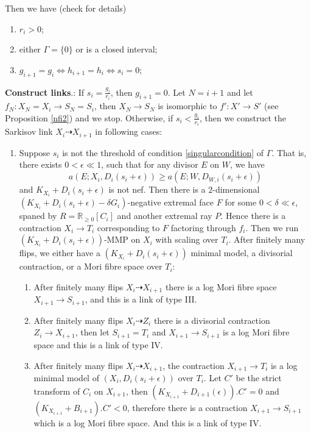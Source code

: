 \documentclass{article}
\begin{document}
Then we have (check \cite[Lemma 4.4]{liuSarkisovProgramGeneralized2021} for details)
\begin{enumerate}
    \item $r_{i}>0$;
    \item either $\Gamma=\{0\} $ or is a closed interval;
    \item $g_{i+1}=g_{i} \Leftrightarrow h_{i+1}=h_{i} \Leftrightarrow s_{i}=0$;
\end{enumerate}
\textbf{Construct links}\label{Construction}.: If $s_{i}=\frac{g_{i}}{r_{i}}$, then $g_{i+1}=0$. Let $N=i+1$  and let $f_{N}:X_{N}=X_{i} \to S_{N}=S_{i}$, then $X_{N}\to S_{N}$ is isomorphic to $f':X'\to S'$ (see Proposition \ref{nfi2}) and  we stop. Otherwise, if  $s_{i}<\frac{g_{i}}{r_{i}}$, then we construct the Sarkisov link $X_{i}\dashrightarrow X_{i+1}$ in following cases:
\begin{enumerate}
  \item\label{2a} Suppose $s_{i}$ is not the threshold of  condition \ref{singularcondition} of $\Gamma$. That is, there exists $0<\epsilon\ll 1$, such that for any divisor $E$ on $W$, we have
    \[
      a(E;X_{i},D_{i}(s_{i}+\epsilon))\geqslant a(E;W,D_{W,i}(s_{i}+\epsilon))
    \]
    and $K_{X_{i}}+D_{i}(s_{i}+\epsilon)$ is not nef. Then there is a $2$-dimensional $(K_{X_{i}}+D_{i}(s_{i}+\epsilon)-\delta G_{i})$-negative extremal face $F$ for some $0< \delta \ll \epsilon $, spaned by $R=\mathbb{R}_{\geqslant 0}[C_{i}]$ and another extremal ray $P$. Hence there is a contraction $X_{i}\to T_{i}$ corresponding to $F$ factoring through $f_{i}$. Then we run $(K_{X_{i}}+D_{i}(s_{i}+\epsilon))$-MMP on $X_{i}$ with scaling over $T_{i}$. After finitely many flips, we either have a $(K_{X_{i}}+D_{i}(s_{i}+\epsilon))$ minimal model, a divisorial contraction, or a Mori fibre space over $T_{i}$: 
    \begin{enumerate}
    \item\label{2a1}After finitely many flips $X_{i}\dashrightarrow X_{i+1}$ there is a log Mori fibre space $X_{i+1}\to S_{i+1}$, and this is a link of type III.
    \item\label{2a2} After finitely many flips $X_{i}\dashrightarrow Z_{i}$ there is a divisorial contraction $Z_{i}\to X_{i+1}$, then let $S_{i+1}=T_{i}$ and $X_{i+1}\to S_{i+1}$ is a log Mori fibre space and this is a link of type IV.
    \item \label{2a3}After finitely many flips $X_{i}\dashrightarrow X_{i+1}$,  the contraction $X_{i+1}\to T_{i}$ is a log minimal model of $\left(X_{i},D_{i}\left(s_{i}+\epsilon\right)\right)$ over $T_{i}$. Let  $C'$ be the strict transform of  $C_{i}$ on $X_{i+1}$, then $(K_{X_{i+1}}+D_{i+1}(\epsilon)).C'=0$ and $(K_{X_{i+1}}+B_{i+1}).C'<0$, therefore there is a contraction  $X_{i+1} \to S_{i+1}$ which is a log Mori fibre space. And this is a link of type IV. 

\end{enumerate}
\end{enumerate}
\end{document}
